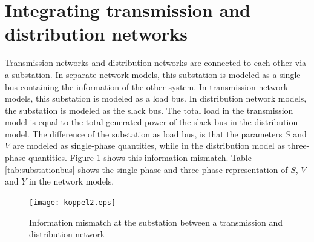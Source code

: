 \documentclass[10pt,journal]{article}
\begin{document}
\begin{table}[h]
\begin{adjustbox}{width=1\textwidth}
\begin{tabular}{ccccc}
\bottomrule
\end{tabular}
\end{adjustbox}
\end{table}

\section{Integrating transmission and distribution networks}
Transmission networks and distribution networks are connected to each other via a substation. In separate network models, this substation is modeled as a single-bus containing the information of the other system. In transmission network models, this substation is modeled as a load bus. In distribution network models, the substation is modeled as the slack bus. The total load in the transmission model is equal to the total generated power of the slack bus in the distribution model. The difference of the substation as load bus, is that the parameters $S$ and $V$ are modeled as single-phase quantities, while in the distribution model as three-phase quantities. Figure \ref{fig:boundary} shows this information mismatch. Table \ref{tab:substationbus} shows the single-phase and three-phase representation of $S$, $V$ and $Y$ in the network models. 
\begin{figure}
    \centering
    \texttt{[image: koppel2.eps]}
    \caption{Information mismatch at the substation between a transmission and distribution network}
    \label{fig:boundary}
\end{figure}
\end{document}
